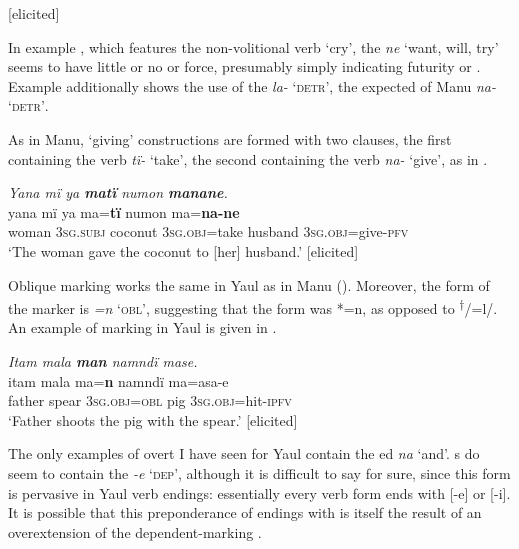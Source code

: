  [elicited]
\z

In example , which features the  non-volitional verb ‘cry’, the  \textit{ne} ‘want, will, try’ seems to have little or no  or  force, presumably simply indicating futurity or . Example  additionally shows the use of the   \textit{la-} ‘\textsc{detr’}, the expected  of Manu \textit{na-} ‘\textsc{detr’}. 

  As in Manu, ‘giving’ constructions are formed with two clauses, the first containing the verb \textit{tï-} ‘take’, the second containing the verb \textit{na-} ‘give’, as in .

  \ea%
    \label{ex:mdy:15a}
          \textit{Yana mï ya \textbf{matï} numon \textbf{manane}.}\\
    \gll yana mï ya ma=\textbf{tï} numon ma=\textbf{na-ne}\\
    woman  3\textsc{sg.subj} coconut 3\textsc{sg.obj}=take husband 3\textsc{sg.obj}=give-\textsc{pfv}\\
    \glt ‘The woman gave the coconut to [her] husband.’ [elicited]
\z

  Oblique marking  works the same in Yaul as in Manu (). Moreover, the form of the marker is \textit{=n} ‘\textsc{obl}’, suggesting that the  form was *=n, as opposed to \textsuperscript{†}/=l/. An example of  marking in Yaul is given in .

\ea%
    \label{ex:mdy:16}
          \textit{Itam mala \textbf{man} namndï mase.}\\
    \gll itam  mala  ma=\textbf{n}      namndï  ma=asa-e\\
    father  spear  \textsc{3sg.obj=obl}  pig      3\textsc{sg.obj}=hit-\textsc{ipfv}\\
    \glt ‘Father shoots the pig with the spear.’ [elicited]
\z


The only examples of overt  I have seen for Yaul contain the ed   \textit{na} ‘and’. s do seem to contain the  \textit{-e} ‘\textsc{dep}’, although it is difficult to say for sure, since this  form is pervasive in Yaul verb endings: essentially every  verb form ends with [-e] or [-i]. It is possible that this preponderance of endings with \linebreak {[-e {\textasciitilde} -i]} is itself the result of an overextension of the dependent-marking .

